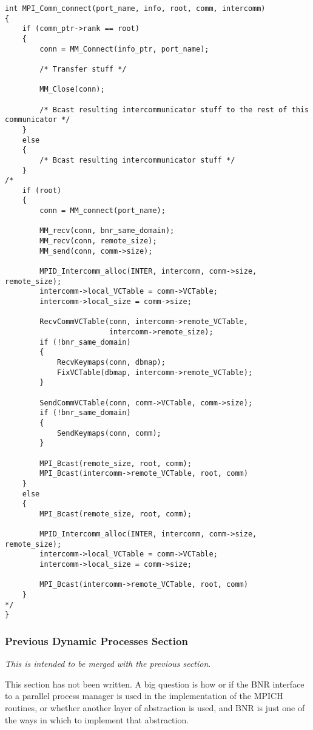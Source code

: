 \documentclass{article}
\begin{document}
\begin{verbatim}
int MPI_Comm_connect(port_name, info, root, comm, intercomm)
{
    if (comm_ptr->rank == root)
    {
        conn = MM_Connect(info_ptr, port_name);

        /* Transfer stuff */

        MM_Close(conn);

        /* Bcast resulting intercommunicator stuff to the rest of this communicator */
    }
    else
    {
        /* Bcast resulting intercommunicator stuff */
    }
/*
    if (root)
    {
        conn = MM_connect(port_name);
        
        MM_recv(conn, bnr_same_domain);
        MM_recv(conn, remote_size);
        MM_send(conn, comm->size);

        MPID_Intercomm_alloc(INTER, intercomm, comm->size, remote_size);
        intercomm->local_VCTable = comm->VCTable;
        intercomm->local_size = comm->size;
        
        RecvCommVCTable(conn, intercomm->remote_VCTable,
                        intercomm->remote_size);
        if (!bnr_same_domain)
        {
            RecvKeymaps(conn, dbmap);
            FixVCTable(dbmap, intercomm->remote_VCTable);
        }
        
        SendCommVCTable(conn, comm->VCTable, comm->size);
        if (!bnr_same_domain)
        {
            SendKeymaps(conn, comm);
        }
        
        MPI_Bcast(remote_size, root, comm);
        MPI_Bcast(intercomm->remote_VCTable, root, comm)
    }
    else
    {
        MPI_Bcast(remote_size, root, comm);
        
        MPID_Intercomm_alloc(INTER, intercomm, comm->size, remote_size);
        intercomm->local_VCTable = comm->VCTable;
        intercomm->local_size = comm->size;
        
        MPI_Bcast(intercomm->remote_VCTable, root, comm)
    }
*/
}
\end{verbatim}


\subsubsection{Previous Dynamic Processes Section }
\label{sec:spawn-impl}

{\em This is intended to be merged with the previous section}.


This section has not been written.  A big question is how or if the BNR
interface to a parallel process manager is used in the implementation
of the MPICH routines, or whether another layer of abstraction is
used, and BNR is just one of the ways in which to implement that abstraction.
\end{document}
